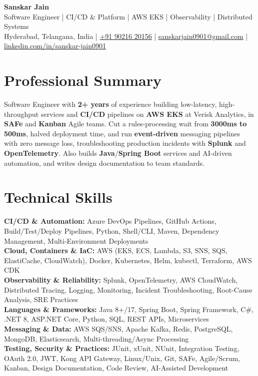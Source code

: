 \documentclass[a4paper,10pt]{article}
\begin{document}
\begin{center}
    {\LARGE \textbf{Sanskar Jain}} \\
    \vspace{2pt}
    Software Engineer \;|\; CI/CD \& Platform \;|\; AWS EKS \;|\; Observability \;|\; Distributed Systems \\
    \vspace{2pt}
    Hyderabad, Telangana, India \;|\;
    \href{tel:+919021620156}{+91 90216 20156} \;|\;
    \href{mailto:sanskarjain0901@gmail.com}{sanskarjain0901@gmail.com} \;|\;
    \href{https://www.linkedin.com/in/sanskar-jain0901/}{linkedin.com/in/sanskar-jain0901}
\end{center}

\section*{Professional Summary}
Software Engineer with \textbf{2+ years} of experience building low-latency, high-throughput services and \textbf{CI/CD} pipelines on \textbf{AWS EKS} at Verisk Analytics, in \textbf{SAFe} and \textbf{Kanban} Agile teams.
Cut a rules-processing wait from \textbf{3000ms to 500ms}, halved deployment time, and run \textbf{event-driven} messaging pipelines with zero message loss, troubleshooting production incidents with \textbf{Splunk} and \textbf{OpenTelemetry}.
Also builds \textbf{Java}/\textbf{Spring Boot} services and AI-driven automation, and writes design documentation to team standards.

\section*{Technical Skills}
\begin{sloppypar}
\noindent
\textbf{CI/CD \& Automation:} Azure DevOps Pipelines, GitHub Actions, Build/Test/Deploy Pipelines, Python, Shell/CLI, Maven, Dependency Management, Multi-Environment Deployments \\
\textbf{Cloud, Containers \& IaC:} AWS (EKS, ECS, Lambda, S3, SNS, SQS, ElastiCache, CloudWatch), Docker, Kubernetes, Helm, kubectl, Terraform, AWS CDK \\
\textbf{Observability \& Reliability:} Splunk, OpenTelemetry, AWS CloudWatch, Distributed Tracing, Logging, Monitoring, Incident Troubleshooting, Root-Cause Analysis, SRE Practices \\
\textbf{Languages \& Frameworks:} Java 8+/17, Spring Boot, Spring Framework, C\#, .NET 8, ASP.NET Core, Python, SQL, REST APIs, Microservices \\
\textbf{Messaging \& Data:} AWS SQS/SNS, Apache Kafka, Redis, PostgreSQL, MongoDB, Elasticsearch, Multi-threading/Async Processing \\
\textbf{Testing, Security \& Practices:} JUnit, xUnit, NUnit, Integration Testing, OAuth 2.0, JWT, Kong API Gateway, Linux/Unix, Git, SAFe, Agile/Scrum, Kanban, Design Documentation, Code Review, AI-Assisted Development
\end{sloppypar}
\end{document}
